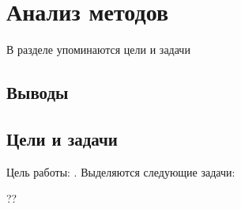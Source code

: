 \chapter{Анализ методов}\label{Chapter:Analysis}

\begin{annotation}
    В разделе упоминаются цели и задачи
\end{annotation}

\section{Выводы}\label{Section:Analysis:Conclusion} 

\section{Цели и задачи}

Цель работы: . Выделяются следующие задачи:
\begin{compactenum}
    \item ??
\end{compactenum}
